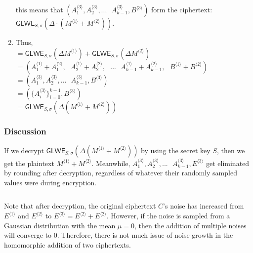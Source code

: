 \begin{myproof}
\begin{enumerate}
this means that $(A_1^{\langle 3 \rangle}, A_2^{\langle 3 \rangle}, ... \text{ } A_{k-1}^{\langle 3 \rangle}, B^{\langle 3 \rangle})$ form the ciphertext: $\textsf{GLWE}_{S, \sigma}(\Delta \cdot (M^{\langle 1 \rangle} + M^{\langle 2 \rangle}))$. \\
\item Thus, \\
$= \textsf{GLWE}_{S, \sigma}(\Delta M^{\langle 1 \rangle}) + \textsf{GLWE}_{S, \sigma}(\Delta M^{\langle 2 \rangle})$ \\
$ = ( A_1^{\langle 1 \rangle} + A_1^{\langle 2 \rangle}, \text{ } A_2^{\langle 1 \rangle} + A_2^{\langle 2 \rangle}, \text{ } ... \text{ } A_{k-1}^{\langle 1 \rangle} + A_{k-1}^{\langle 2 \rangle}, \text{ } B^{\langle 1 \rangle} + B^{\langle 2 \rangle} )$ \\
$ = ( A_1^{\langle 3 \rangle}, A_2^{\langle 3 \rangle}, ... \text{ } A_{k-1}^{\langle 3 \rangle}, B^{\langle 3 \rangle})$ \\
$ = ( \{A_i^{\langle 3 \rangle}\}_{i=0}^{k-1}, B^{\langle 3 \rangle})$ \\
$= \textsf{GLWE}_{S, \sigma}(\Delta (M^{\langle 1 \rangle} + M^{\langle 2 \rangle}))$


\end{enumerate}
\end{myproof}

\subsubsection{Discussion}
\label{subsubsec:glwe-add-cipher-discuss} 

 If we decrypt $\textsf{GLWE}_{S, \sigma}(\Delta(M^{\langle 1 \rangle} + M^{\langle 2 \rangle}))$ by using the secret key $S$, then we get the plaintext $M^{\langle 1 \rangle} + M^{\langle 2 \rangle}$. Meanwhile, $A_1^{\langle 3 \rangle}, A_2^{\langle 3 \rangle}, ... \text{ } A_{k-1}^{\langle 3 \rangle}, E^{\langle 3 \rangle}$ get eliminated by rounding after decryption, regardless of whatever their randomly sampled values were during encryption.

$ $

 Note that after decryption, the original ciphertext $C$'s noise has increased from $E^{\langle 1 \rangle}$ and $E^{\langle 2 \rangle}$ to $E^{\langle 3 \rangle} = E^{\langle 2 \rangle} + E^{\langle 2 \rangle}$. However, if the noise is sampled from a Gaussian distribution with the mean $\mu = 0$, then the addition of multiple noises will converge to 0. Therefore, there is not much issue of noise growth in the homomorphic addition of two ciphertexts. 

